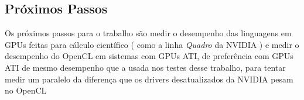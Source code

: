 \subsection{Próximos Passos}
  Os próximos passos para o trabalho são medir o desempenho das linguagens em GPUs feitas para cálculo científico 
  ( como a linha \textit {Quadro} da NVIDIA ) e medir o desempenho do OpenCL em sistemas com GPUs ATI, de preferência com GPUs ATI de mesmo
  desempenho que a usada nos testes desse trabalho, para tentar medir um paralelo da diferença que os drivers desatualizados da NVIDIA
  pesam no OpenCL
